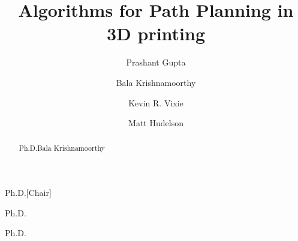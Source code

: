 \documentclass{wsu-thesis}
\title{Algorithms for Path Planning in 3D printing}
\author{Prashant Gupta}
\theoremstyle{plain}
\newcommand{\phd}{Ph.D.}
\newcommand{\chapterdir}{./chapters}
\newcommand{\frontmatterdir}{./front-matter}
\newcommand{\appendixdir}{./appendices}
\newcommand{\referencedir}{./references}
\begin{document}
\maketitle

\begin{signaturepage}
  \signature{Bala Krishnamoorthy}{\phd}[Chair]
  \signature{Kevin R. Vixie}{\phd}
  \signature{Matt Hudelson}{\phd}
\end{signaturepage}

\begin{acknowledgements}
  
\end{acknowledgements}

\begin{abstract}{\phd}{Bala Krishnamoorthy}
  
\end{abstract}

\tableofcontents
\listoffigures
\listoftables

\begin{dedication}
  
\end{dedication}

\begin{mainchapters}
  
  
  
  
  
\end{mainchapters}



%

%  
\end{document}

